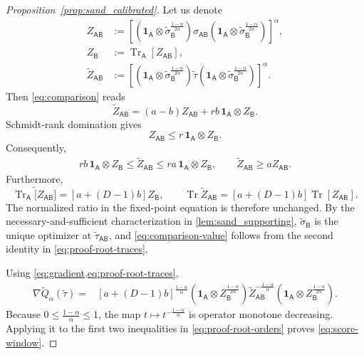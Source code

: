 \documentclass[11pt,reqno]{amsart}
\theoremstyle{definition}
\DeclareMathOperator{\Tr}{Tr}
\newcommand{\I}{\mathbf 1}
\newcommand{\A}{\mathsf{A}}
\newcommand{\B}{\mathsf{B}}
\newcommand{\sand}{\widetilde}
\begin{document}
\begin{proof}[Proposition~\ref{prop:sand_calibrated}]
Let us denote
\begin{align*}
 Z_{\A\B}
 &:={\left[
 (\I_{\A}\otimes\sand\sigma_{\B}^{\frac{1-\alpha}{2\alpha}})
 \sigma_{\A\B}
 (\I_{\A}\otimes\sand\sigma_{\B}^{\frac{1-\alpha}{2\alpha}})
 \right]^{\alpha}},\\
 Z_{\B}&:=\Tr_{\A}[Z_{\A\B}],\\
 \sand Z_{\A\B}
 &:={\left[
 (\I_{\A}\otimes\sand\sigma_{\B}^{\frac{1-\alpha}{2\alpha}})
 \sand\tau
 (\I_{\A}\otimes\sand\sigma_{\B}^{\frac{1-\alpha}{2\alpha}})
 \right]^{\alpha}}.
\end{align*}
Then \cref{eq:comparison} reads
\begin{equation}
 \sand Z_{\A\B}=(a-b)Z_{\A\B}+rb\,\I_{\A}\otimes Z_{\B}.
 \label{eq:proof-comparison-root}
\end{equation}
Schmidt-rank domination gives
\begin{equation}
 Z_{\A\B}\leq r\,\I_{\A}\otimes Z_{\B}.
 \label{eq:proof-Schmidt}
\end{equation}
Consequently,
\begin{align}
 rb\,\I_{\A}\otimes Z_{\B}
 \leq\sand Z_{\A\B}
 \leq ra\,\I_{\A}\otimes Z_{\B},
 \qquad
 \sand Z_{\A\B}\geq aZ_{\A\B}.
 \label{eq:proof-root-orders}
\end{align}
Furthermore,
\begin{equation}
 \Tr_{\A}\sand [Z_{\A\B}]=[a+(D-1)b]Z_{\B},
 \qquad
 \Tr\sand Z_{\A\B}=[a+(D-1)b]\Tr [Z_{\A\B}].
 \label{eq:proof-root-traces}
\end{equation}
The normalized ratio in the fixed-point equation is therefore unchanged.
By the necessary-and-sufficient characterization in
\cref{lem:sand_supporting}, $\sand\sigma_{\B}$ is the unique optimizer at
$\sand\tau_{\A\B}$, and \cref{eq:comparison-value} follows from the second identity
in \cref{eq:proof-root-traces}.

Using \cref{eq:gradient,eq:proof-root-traces},
\begin{align}
\nabla\sand Q_{\alpha}(\sand\tau)
={}&[a+(D-1)b]^{\frac{1-\alpha}{\alpha}}
 (\I_{\A}\otimes Z_{\B}^{\frac{1-\alpha}{2\alpha}})
 \sand Z_{\A\B}^{-\frac{1-\alpha}{\alpha}}
 (\I_{\A}\otimes Z_{\B}^{\frac{1-\alpha}{2\alpha}}).
\label{eq:proof-score}
\end{align}
Because $0\leq\frac{1-\alpha}{\alpha}\leq1$, the map
$t\mapsto t^{-\frac{1-\alpha}{\alpha}}$ is operator monotone decreasing.  Applying it to
the first two inequalities in \cref{eq:proof-root-orders} proves
\cref{eq:score-window}.


\end{proof}
\end{document}
